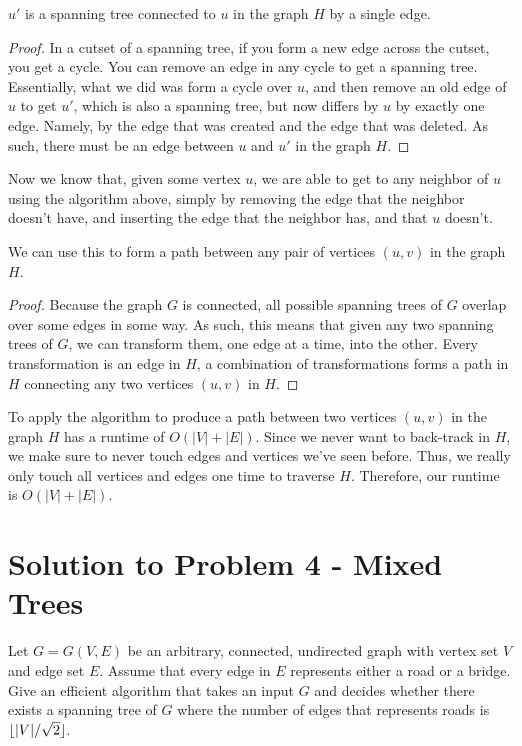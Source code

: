 \documentclass[11pt]{article}
\DeclarePairedDelimiter\floor{\lfloor}{\rfloor}
\begin{document}
\begin{claim*} $u'$ is a spanning tree connected to $u$ in the graph $H$ by a single edge.\end{claim*}
\begin{proof} In a cutset of a spanning tree, if you form a new edge across the cutset, you get a cycle. You can remove an edge in any cycle to get a spanning tree. Essentially, what we did was form a cycle over $u$, and then remove an old edge of $u$ to get $u'$, which is also a spanning tree, but now differs by $u$ by exactly one edge. Namely, by the edge that was created and the edge that was deleted. As such, there must be an edge between $u$ and $u'$ in the graph $H$.\end{proof}

Now we know that, given some vertex $u$, we are able to get to any neighbor of $u$ using the algorithm above, simply by removing the edge that the neighbor doesn't have, and inserting the edge that the neighbor has, and that $u$ doesn't.

\begin{claim*} We can use this to form a path between any pair of vertices $(u,v)$ in the graph $H$.\end{claim*}
\begin{proof}Because the graph $G$ is connected, all possible spanning trees of $G$ overlap over some edges in some way. As such, this means that given any two spanning trees of $G$, we can transform them, one edge at a time, into the other. Every transformation is an edge in $H$, a combination of transformations forms a path in $H$ connecting any two vertices $(u,v)$ in $H$. \end{proof}

To apply the algorithm to produce a path between two vertices $(u,v)$ in the graph $H$ has a runtime of $O(|V| + |E|)$. Since we never want to back-track in $H$, we make sure to never touch edges and vertices we've seen before. Thus, we really only touch all vertices and edges one time to traverse $H$. Therefore, our runtime is $O(|V| + |E|)$.


\newpage

\section*{Solution to Problem 4 - Mixed Trees}
 Let $G = G(V, E)$ be an arbitrary, connected, undirected graph with vertex set $V$ and edge set $E$. Assume that every edge in $E$ represents either a road or a bridge. Give an efficient algorithm that takes an input $G$ and decides whether there exists a spanning tree of $G$ where the number of edges that represents roads is $\floor{|V|/\sqrt{2}}$.
 
\end{document}
